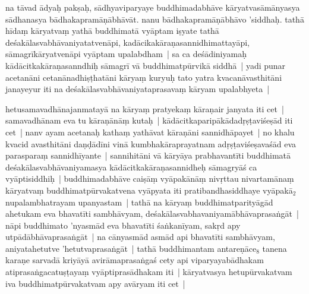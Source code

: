 \documentclass[article,12pt,a4paper]{memoir}%
\newcounter{parCount}
\begin{document}
	  
	

	  \pstart \leavevmode%
	\label{thakur75-40.23}na tāvad ādyaḥ pakṣaḥ, sādhyaviparyaye buddhimadabhāve kāryatvasāmānyasya sādhanasya bādhakapramāṇābhāvāt. nanu bādhakapramāṇā\label{ratnakīrtinibandhāvali__36r1PF7IMWCZ259HVW7MWE6RCOV}bhāvo 'siddhaḥ\label{ratnakīrtinibandhāvali__36r1PF7IMWC93RHV8K3QH5DZGWS}. tathā hīdaṃ kāryatvaṃ yathā buddhimatā vyāptam iṣyate tathā deśakālasvabhāvaniyatatvenāpi, kadācikakāraṇasannidhimattayāpi, sāmagrīkāryatvenāpi vyāptam upalabdham | sa ca deśādiniyamaḥ kādācitkakāraṇasanndhiḥ sāmagrī vā buddhimatpūrvikā siddhā | yadi punar acetanāni cetanānadhiṣṭhatāni kāryaṃ kuryuḥ tato yatra kvacanāvasthitāni janayeyur iti na deśakālasvabhāvaniyataprasavaṃ kāryam upalabhyeta |
	{}
	\pend%
      

	  \pstart \leavevmode%
	\label{thakur75-40.30}hetusamavadhānajanmatayā na kāryaṃ pratyekaṃ kāraṇair janyata iti cet | samavadhānam eva tu kāraṇānāṃ kutaḥ | kādācitkaparipākādadṛṣṭaviśeṣād iti cet | nanv ayam acetanaḥ kathaṃ yathāvat kāraṇāni sannidhāpayet | no khalu kvacid avasthitāni daṇḍādīni vinā kumbhakāraprayatnam adṛṣṭaviśeṣavaśād eva parasparaṃ sannidhīyante | sannihitāni vā kāryāya prabhavantīti buddhimatā deśakālasvabhāvaniyamasya kādācitkakāraṇasannidheḥ sāmagryāś ca vyāptisiddhiḥ | buddhimadabhāve caiṣāṃ vyāpakānāṃ nivṛttau nivartamānaṃ kāryatvaṃ buddhimatpūrvakatvena vyāpyata iti pratibandhasiddhaye vyāpakā{\tiny $_{2}$}\label{RNA-ms-23a-3}nupalambhatrayam upanyastam | \label{ratnakīrtinibandhāvali__36r1PF7IMWBJY889FM807QZKIA6}tathā na\label{ratnakīrtinibandhāvali__36r1PF7IMWATRHA5MXY189N75LV} kāryaṃ buddhimatparityāgād ahetukam eva bhavatīti sambhāvyam, deśakālasvabhavaniyamābhāvaprasaṅgāt | nāpi buddhimato 'nyasmād eva bhavatīti śaṅkanīyam, sakṛd apy utpādābhāvaprasaṅgāt | na cānyasmād asmād api bhavatīti sambhāvyam, aniyatahetutve 'hetutvaprasaṅgāt | tathā buddhimantam antareṇāce{\tiny $_{8}$}\label{ĪSD-41-9} tanena karaṇe sarvadā kriyāyā avirāmaprasaṅgaś cety api viparyayabādhakam atiprasaṅgacatuṣṭayaṃ vyāptiprasādhakam iti | kāryatvasya hetupūrvakatvam iva buddhimatpūrvakatvam apy avāryam iti cet |
	{}
	\pend%
      
\end{document}
